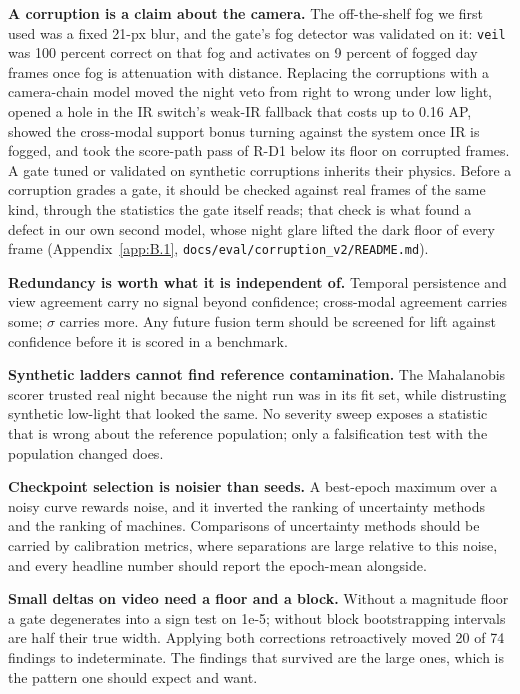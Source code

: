 \documentclass[journal,onecolumn]{IEEEtran}
\begin{document}
\textbf{A corruption is a claim about the camera.} The off-the-shelf fog we first used was a fixed 21-px blur, and the gate's fog detector was validated on it: \texttt{veil} was 100 percent correct on that fog and activates on 9 percent of fogged day frames once fog is attenuation with distance. Replacing the corruptions with a camera-chain model moved the night veto from right to wrong under low light, opened a hole in the IR switch's weak-IR fallback that costs up to 0.16 AP, showed the cross-modal support bonus turning against the system once IR is fogged, and took the score-path pass of R-D1 below its floor on corrupted frames. A gate tuned or validated on synthetic corruptions inherits their physics. Before a corruption grades a gate, it should be checked against real frames of the same kind, through the statistics the gate itself reads; that check is what found a defect in our own second model, whose night glare lifted the dark floor of every frame (Appendix~\ref{app:B.1}, \texttt{docs/\allowbreak{}eval/\allowbreak{}corruption\_\allowbreak{}v2/\allowbreak{}README.md}).

\textbf{Redundancy is worth what it is independent of.} Temporal persistence and view agreement carry no signal beyond confidence; cross-modal agreement carries some; $\sigma$ carries more. Any future fusion term should be screened for lift against confidence before it is scored in a benchmark.

\textbf{Synthetic ladders cannot find reference contamination.} The Mahalanobis scorer trusted real night because the night run was in its fit set, while distrusting synthetic low-light that looked the same. No severity sweep exposes a statistic that is wrong about the reference population; only a falsification test with the population changed does.

\textbf{Checkpoint selection is noisier than seeds.} A best-epoch maximum over a noisy curve rewards noise, and it inverted the ranking of uncertainty methods and the ranking of machines. Comparisons of uncertainty methods should be carried by calibration metrics, where separations are large relative to this noise, and every headline number should report the epoch-mean alongside.

\textbf{Small deltas on video need a floor and a block.} Without a magnitude floor a gate degenerates into a sign test on 1e-5; without block bootstrapping intervals are half their true width. Applying both corrections retroactively moved 20 of 74 findings to indeterminate. The findings that survived are the large ones, which is the pattern one should expect and want.
\end{document}
